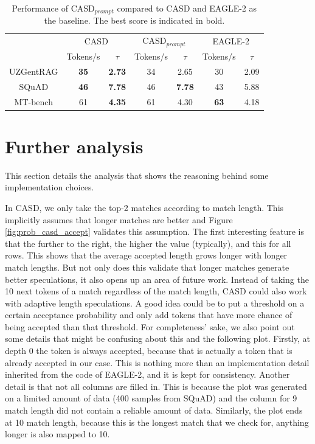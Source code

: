\begin{table}[h]
  \centering
  \begin{tabular}{ccc|cc|cc}
      & \multicolumn{2}{c}{CASD} & \multicolumn{2}{c}{CASD$_{prompt}$} & \multicolumn{2}{c}{EAGLE-2} \\
      \cline{2-7}
      & Tokens/s & $\tau$ & Tokens/s & $\tau$ & Tokens/s & $\tau$ \\
      \hline
      UZGentRAG & \textbf{35} & \textbf{2.73} & 34 & 2.65 & 30 & 2.09 \\
      SQuAD     & \textbf{46} & \textbf{7.78} & 46 & \textbf{7.78} & 43 & 5.88 \\
      MT-bench  & 61 & \textbf{4.35} & 61 & 4.30 & \textbf{63} & 4.18 \\
      \hline
  \end{tabular}
  \caption{Performance of CASD$_{prompt}$ compared to CASD and EAGLE-2 as the baseline. The best score is indicated in bold.}
  \label{tab:ablation_benchmarks}
\end{table}

\section{Further analysis}
\label{sec:further_analysis}
This section details the analysis that shows the reasoning behind some implementation choices.

In CASD, we only take the top-2 matches according to match length. This implicitly assumes that longer matches are better and Figure \ref{fig:prob_casd_accept} validates this assumption. The first interesting feature is that the further to the right, the higher the value (typically), and this for all rows. This shows that the average accepted length grows longer with longer match lengths. But not only does this validate that longer matches generate better speculations, it also opens up an area of future work. Instead of taking the 10 next tokens of a match regardless of the match length, CASD could also work with adaptive length speculations. A good idea could be to put a threshold on a certain acceptance probability and only add tokens that have more chance of being accepted than that threshold. For completeness' sake, we also point out some details that might be confusing about this and the following plot. Firstly, at depth 0 the token is always accepted, because that is actually a token that is already accepted in our case. This is nothing more than an implementation detail inherited from the code of EAGLE-2, and it is kept for consistency. Another detail is that not all columns are filled in. This is because the plot was generated on a limited amount of data (400 samples from SQuAD) and the column for 9 match length did not contain a reliable amount of data. Similarly, the plot ends at 10 match length, because this is the longest match that we check for, anything longer is also mapped to 10. 

